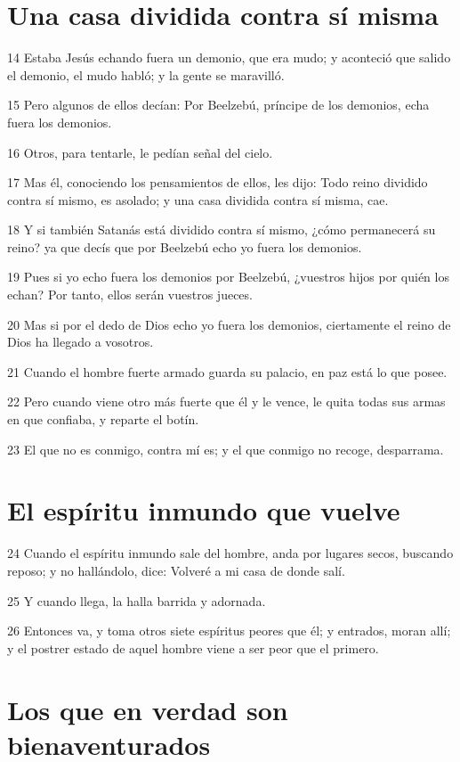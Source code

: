 \section*{Una casa dividida contra sí misma}

\par 14 Estaba Jesús echando fuera un demonio, que era mudo; y aconteció que salido el demonio, el mudo habló; y la gente se maravilló.
\par 15 Pero algunos de ellos decían: Por Beelzebú, príncipe de los demonios, echa fuera los demonios.
\par 16 Otros, para tentarle, le pedían señal del cielo.
\par 17 Mas él, conociendo los pensamientos de ellos, les dijo: Todo reino dividido contra sí mismo, es asolado; y una casa dividida contra sí misma, cae.
\par 18 Y si también Satanás está dividido contra sí mismo, ¿cómo permanecerá su reino? ya que decís que por Beelzebú echo yo fuera los demonios.
\par 19 Pues si yo echo fuera los demonios por Beelzebú, ¿vuestros hijos por quién los echan? Por tanto, ellos serán vuestros jueces.
\par 20 Mas si por el dedo de Dios echo yo fuera los demonios, ciertamente el reino de Dios ha llegado a vosotros.
\par 21 Cuando el hombre fuerte armado guarda su palacio, en paz está lo que posee.
\par 22 Pero cuando viene otro más fuerte que él y le vence, le quita todas sus armas en que confiaba, y reparte el botín.
\par 23 El que no es conmigo, contra mí es; y el que conmigo no recoge, desparrama.

\section*{El espíritu inmundo que vuelve}

\par 24 Cuando el espíritu inmundo sale del hombre, anda por lugares secos, buscando reposo; y no hallándolo, dice: Volveré a mi casa de donde salí.
\par 25 Y cuando llega, la halla barrida y adornada.
\par 26 Entonces va, y toma otros siete espíritus peores que él; y entrados, moran allí; y el postrer estado de aquel hombre viene a ser peor que el primero.

\section*{Los que en verdad son bienaventurados}

